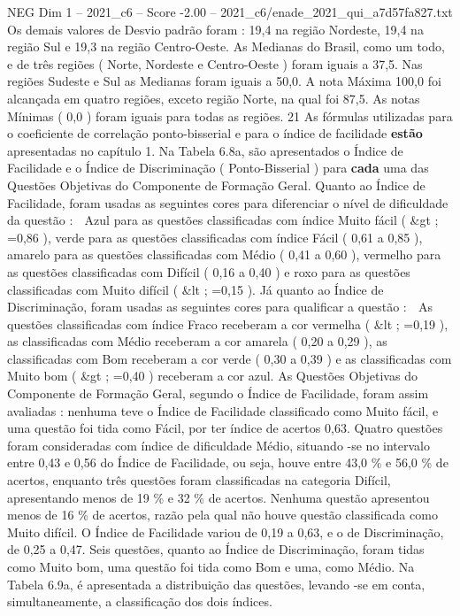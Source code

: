 \begin{textsample}{NEG Dim 1 – 2021\_c6 – Score -2.00 – 2021\_c6/enade\_2021\_qui\_a7d57fa827.txt}
Os demais valores de Desvio padrão foram : 19,4 na região Nordeste, 19,4 na região Sul e 19,3 na região Centro-Oeste.
As Medianas do Brasil, como um todo, e de três regiões ( Norte, Nordeste e Centro-Oeste ) foram iguais a 37,5.
Nas regiões Sudeste e Sul as Medianas foram iguais a 50,0.
A nota Máxima 100,0 foi alcançada em quatro regiões, exceto região Norte, na qual foi 87,5.
As notas Mínimas ( 0,0 ) foram iguais para todas as regiões. 21 As fórmulas utilizadas para o coeficiente de correlação ponto-bisserial e para o índice de facilidade \textbf{estão} apresentadas no capítulo 1.
Na Tabela 6.8a, são apresentados o Índice de Facilidade e o Índice de Discriminação ( Ponto-Bisserial ) para \textbf{cada} uma das Questões Objetivas do Componente de Formação Geral.
Quanto ao Índice de Facilidade, foram usadas as seguintes cores para diferenciar o nível de dificuldade da questão :  Azul para as questões classificadas com índice Muito fácil ( \&gt ; =0,86 ), verde para as questões classificadas com índice Fácil ( 0,61 a 0,85 ), amarelo para as questões classificadas com Médio ( 0,41 a 0,60 ), vermelho para as questões classificadas com Difícil ( 0,16 a 0,40 ) e roxo para as questões classificadas com Muito difícil ( \&lt ; =0,15 ).
Já quanto ao Índice de Discriminação, foram usadas as seguintes cores para qualificar a questão :  As questões classificadas com índice Fraco receberam a cor vermelha ( \&lt ; =0,19 ), as classificadas com Médio receberam a cor amarela ( 0,20 a 0,29 ), as classificadas com Bom receberam a cor verde ( 0,30 a 0,39 ) e as classificadas com Muito bom ( \&gt ; =0,40 ) receberam a cor azul.
As Questões Objetivas do Componente de Formação Geral, segundo o Índice de Facilidade, foram assim avaliadas : nenhuma teve o Índice de Facilidade classificado como Muito fácil, e uma questão foi tida como Fácil, por ter índice de acertos 0,63.
Quatro questões foram consideradas com índice de dificuldade Médio, situando -se no intervalo entre 0,43 e 0,56 do Índice de Facilidade, ou seja, houve entre 43,0 \% e 56,0 \% de acertos, enquanto três questões foram classificadas na categoria Difícil, apresentando menos de 19 \% e 32 \% de acertos.
Nenhuma questão apresentou menos de 16 \% de acertos, razão pela qual não houve questão classificada como Muito difícil.
O Índice de Facilidade variou de 0,19 a 0,63, e o de Discriminação, de 0,25 a 0,47.
Seis questões, quanto ao Índice de Discriminação, foram tidas como Muito bom, uma questão foi tida como Bom e uma, como Médio.
Na Tabela 6.9a, é apresentada a distribuição das questões, levando -se em conta, simultaneamente, a classificação dos dois índices.

\end{textsample}
